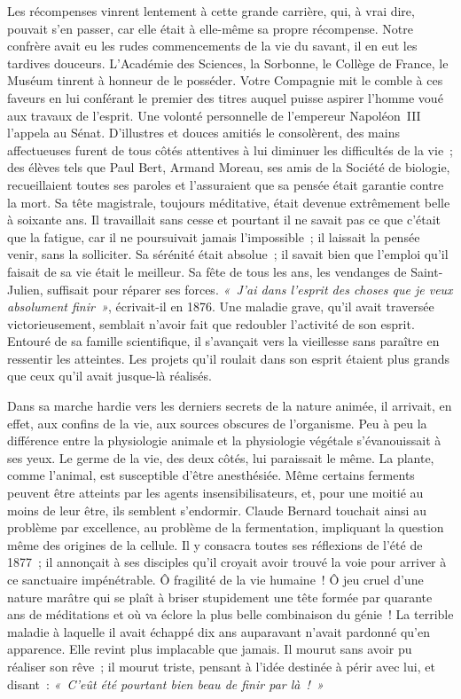 \documentclass[french,twoside]{book} %
\newcommand\orgName[1]{#1}
\newcommand\persName[1]{#1}
\newcommand\placeName[1]{#1}
\begin{document}
Les récompenses vinrent lentement à cette grande carrière, qui, à vrai dire, pouvait s’en passer, car elle était à elle-même sa propre récompense. Notre confrère avait eu les rudes commencements de la vie du savant, il en eut les tardives douceurs. L’{\orgName Académie des Sciences}, la {\orgName Sorbonne}, le {\orgName Collège de France,} le {\orgName Muséum} tinrent à honneur de le posséder. Votre {\orgName Compagnie} mit le comble à ces faveurs en lui conférant le premier des titres auquel puisse aspirer l’homme voué aux travaux de l’esprit. Une volonté personnelle de l’{\persName empereur Napoléon III} l’appela au {\orgName Sénat}. D’illustres et douces amitiés le consolèrent, des mains affectueuses furent de tous côtés attentives à lui diminuer les difficultés de la vie ; des élèves tels que {\persName Paul Bert}, {\persName Armand Moreau}, ses amis de la {\orgName Société de biologie}, recueillaient toutes ses paroles et l’assuraient que sa pensée était garantie contre la mort. Sa tête magistrale, toujours méditative, était devenue extrêmement belle à soixante ans. Il travaillait sans cesse et pourtant il ne savait pas ce que c’était que la fatigue, car il ne poursuivait jamais l’impossible ; il laissait la pensée venir, sans la solliciter. Sa sérénité était absolue ; il savait bien que l’emploi qu’il faisait de sa vie était le meilleur. Sa fête de tous les ans, les vendanges de {\placeName Saint-Julien}, suffisait pour réparer ses forces. \emph{« J’ai dans l’esprit des choses que je veux absolument finir »}, écrivait-il en 1876. Une maladie grave, qu’il avait traversée victorieusement, semblait n’avoir fait que redoubler l’activité de son esprit. Entouré de sa famille scientifique, il s’avançait vers la vieillesse sans paraître en ressentir les atteintes. Les projets qu’il roulait dans son esprit étaient plus grands que ceux qu’il avait jusque-là réalisés.\par
Dans sa marche hardie vers les derniers secrets de la nature animée, il arrivait, en effet, aux confins de la vie, aux sources obscures de l’organisme. Peu à peu la différence entre la physiologie animale et la physiologie végétale s’évanouissait à ses yeux. Le germe de la vie, des deux côtés, lui paraissait le même. La plante, comme l’animal, est susceptible d’être anesthésiée. Même certains ferments peuvent être atteints par les agents insensibilisateurs, et, pour une moitié au moins de leur être, ils semblent s’endormir. {\persName Claude Bernard} touchait ainsi au problème par excellence, au problème de la fermentation, impliquant la question même des origines de la cellule. Il y consacra toutes ses réflexions de l’été de 1877 ; il annonçait à ses disciples qu’il croyait avoir trouvé la voie pour arriver à ce sanctuaire impénétrable. Ô fragilité de la vie humaine ! Ô jeu cruel d’une nature marâtre qui se plaît à briser stupidement une tête formée par quarante ans de méditations et où va éclore la plus belle combinaison du génie ! La terrible maladie à laquelle il avait échappé dix ans auparavant n’avait pardonné qu’en apparence. Elle revint plus implacable que jamais. Il mourut sans avoir pu réaliser son rêve ; il mourut triste, pensant à l’idée destinée à périr avec lui, et disant : \emph{« C’eût été pourtant bien beau de finir par là ! »}\par
\end{document}
